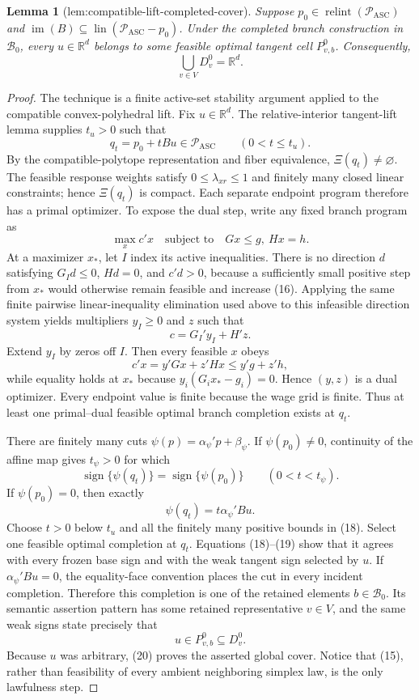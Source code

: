 \documentclass{article}
\newtheorem{lemma}{Lemma}
\begin{document}
\begin{lemma}[lem:compatible-lift-completed-cover]\label{lem:compatible-lift-completed-cover}
Suppose \(p_0\in\operatorname{relint}(\mathcal P_{\mathrm{ASC}})\) and \(\operatorname{im}(B)\subseteq\operatorname{lin}(\mathcal P_{\mathrm{ASC}}-p_0)\).  Under the completed branch construction in \(\mathcal B_0\), every \(u\in\mathbb R^d\) belongs to some feasible optimal tangent cell \(P_{v,b}^0\).  Consequently,
\[
 \bigcup_{v\in V}D_v^0=\mathbb R^d.
\]
\end{lemma}
\begin{proof}
The technique is a finite active-set stability argument applied to the compatible convex-polyhedral lift.  Fix \(u\in\mathbb R^d\).  The relative-interior tangent-lift lemma supplies \(t_u>0\) such that
\[
 q_t=p_0+tBu\in\mathcal P_{\mathrm{ASC}}
 \qquad(0<t\le t_u). \tag{15}
\]
By the compatible-polytope representation and fiber equivalence, \(\Xi(q_t)\ne\varnothing\).  The feasible response weights satisfy \(0\le\lambda_{xr}\le1\) and finitely many closed linear constraints; hence \(\Xi(q_t)\) is compact.  Each separate endpoint program therefore has a primal optimizer.  To expose the dual step, write any fixed branch program as
\[
 \max_x c'x\quad\text{subject to}\quad Gx\le g,\ Hx=h. \tag{16}
\]
At a maximizer \(x_*\), let \(I\) index its active inequalities.  There is no direction \(d\) satisfying \(G_Id\le0\), \(Hd=0\), and \(c'd>0\), because a sufficiently small positive step from \(x_*\) would otherwise remain feasible and increase (16).  Applying the same finite pairwise linear-inequality elimination used above to this infeasible direction system yields multipliers \(y_I\ge0\) and \(z\) such that
\[
 c=G_I'y_I+H'z. \tag{17}
\]
Extend \(y_I\) by zeros off \(I\).  Then every feasible \(x\) obeys
\[
 c'x=y'Gx+z'Hx\le y'g+z'h,
\]
while equality holds at \(x_*\) because \(y_i(G_ix_*-g_i)=0\).  Hence \((y,z)\) is a dual optimizer.  Every endpoint value is finite because the wage grid is finite.  Thus at least one primal--dual feasible optimal branch completion exists at \(q_t\).

There are finitely many cuts \(\psi(p)=\alpha_\psi'p+\beta_\psi\).  If \(\psi(p_0)\ne0\), continuity of the affine map gives \(t_\psi>0\) for which
\[
 \operatorname{sign}\{\psi(q_t)\}=\operatorname{sign}\{\psi(p_0)\}
 \qquad(0<t<t_\psi). \tag{18}
\]
If \(\psi(p_0)=0\), then exactly
\[
 \psi(q_t)=t\alpha_\psi'Bu. \tag{19}
\]
Choose \(t>0\) below \(t_u\) and all the finitely many positive bounds in (18).  Select one feasible optimal completion at \(q_t\).  Equations (18)--(19) show that it agrees with every frozen base sign and with the weak tangent sign selected by \(u\).  If \(\alpha_\psi'Bu=0\), the equality-face convention places the cut in every incident completion.  Therefore this completion is one of the retained elements \(b\in\mathcal B_0\).  Its semantic assertion pattern has some retained representative \(v\in V\), and the same weak signs state precisely that
\[
 u\in P_{v,b}^0\subseteq D_v^0. \tag{20}
\]
Because \(u\) was arbitrary, (20) proves the asserted global cover.  Notice that (15), rather than feasibility of every ambient neighboring simplex law, is the only lawfulness step.
\end{proof}
\end{document}
